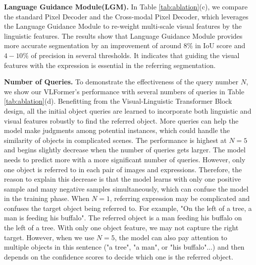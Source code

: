 \textbf{Language Guidance Module(LGM).} In Table \ref{tab:ablation}(c), we compare the standard Pixel Decoder and the Cross-modal Pixel Decoder, which leverages the Language Guidance Module to re-weight multi-scale visual features by the linguistic features. The results show that Language Guidance Module provides more accurate segmentation by an improvement of around $8\%$ in IoU score and $4-10\%$ of precision in several thresholds. It indicates that guiding the visual features with the expression is essential in the referring segmentation.



\textbf{Number of Queries.}
To demonstrate the effectiveness of the query number $N$, we show our VLFormer's performance with several numbers of queries in Table \ref{tab:ablation}(d). Benefitting from the Visual-Linguistic Transformer Block design, all the initial object queries are learned to incorporate both linguistic and visual features robustly to find the referred object. More queries can help the model make judgments among potential instances, which could handle the similarity of objects in complicated scenes. 
The performance is highest at $N = 5$ and begins slightly decrease when the number of queries gets larger. The model needs to predict more with a more significant number of queries. However, only one object is referred to in each pair of images and expressions. Therefore, the reason to explain this decrease is that the model learns with only one positive sample and many negative samples simultaneously, which can confuse the model in the training phase. When $N = 1$, referring expression may be complicated and confuses the target object being referred to. For example, "On the left of a tree, a man is feeding his buffalo". The referred object is a man feeding his buffalo on the left of a tree. With only one object feature, we may not capture the right target. However, when we use $N = 5$, the model can also pay attention to multiple objects in this sentence ("a tree", "a man", or "his buffalo"...) and then depends on the confidence scores to decide which one is the referred object.








